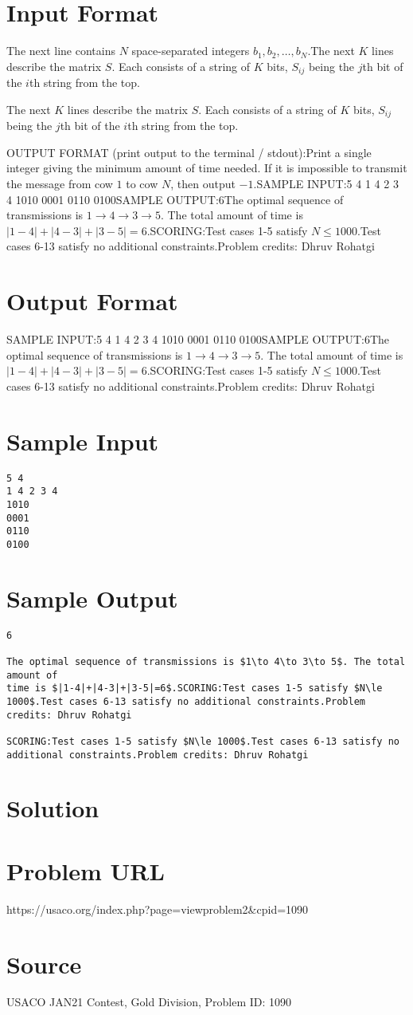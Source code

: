 \documentclass[12pt]{article}
\begin{document}
\section*{Input Format}
The next line contains $N$ space-separated integers $b_1,b_2,\ldots,b_N$.The next $K$ lines describe the matrix $S$.  Each consists of a string of  $K$
bits, $S_{ij}$ being the $j$th bit of the $i$th string from the top.

The next $K$ lines describe the matrix $S$.  Each consists of a string of  $K$
bits, $S_{ij}$ being the $j$th bit of the $i$th string from the top.

OUTPUT FORMAT (print output to the terminal / stdout):Print a single integer giving the minimum amount of time needed.  If it is
impossible to transmit the message from cow $1$ to cow $N$, then  output $-1$.SAMPLE INPUT:5 4
1 4 2 3 4
1010
0001
0110
0100SAMPLE OUTPUT:6The optimal sequence of transmissions is $1\to 4\to 3\to 5$. The total amount of
time is $|1-4|+|4-3|+|3-5|=6$.SCORING:Test cases 1-5 satisfy $N\le 1000$.Test cases 6-13 satisfy no additional constraints.Problem credits: Dhruv Rohatgi

\section*{Output Format}
SAMPLE INPUT:5 4
1 4 2 3 4
1010
0001
0110
0100SAMPLE OUTPUT:6The optimal sequence of transmissions is $1\to 4\to 3\to 5$. The total amount of
time is $|1-4|+|4-3|+|3-5|=6$.SCORING:Test cases 1-5 satisfy $N\le 1000$.Test cases 6-13 satisfy no additional constraints.Problem credits: Dhruv Rohatgi

\section*{Sample Input}
\begin{verbatim}
5 4
1 4 2 3 4
1010
0001
0110
0100
\end{verbatim}

\section*{Sample Output}
\begin{verbatim}
6

The optimal sequence of transmissions is $1\to 4\to 3\to 5$. The total amount of
time is $|1-4|+|4-3|+|3-5|=6$.SCORING:Test cases 1-5 satisfy $N\le 1000$.Test cases 6-13 satisfy no additional constraints.Problem credits: Dhruv Rohatgi

SCORING:Test cases 1-5 satisfy $N\le 1000$.Test cases 6-13 satisfy no additional constraints.Problem credits: Dhruv Rohatgi
\end{verbatim}

\section*{Solution}


\section*{Problem URL}
https://usaco.org/index.php?page=viewproblem2&cpid=1090

\section*{Source}
USACO JAN21 Contest, Gold Division, Problem ID: 1090
\end{document}
